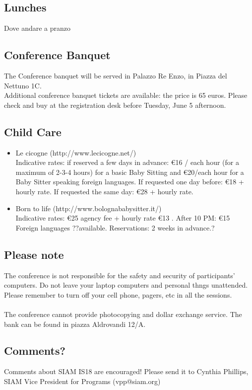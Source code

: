 \begin{multicols}{2}
\subsection*{Lunches}
Dove andare a pranzo
\subsection*{Conference Banquet}
The Conference banquet will be served in Palazzo Re Enzo, in Piazza del Nettuno 1C.\\ Additional conference banquet tickets are available: the price is 65 euros. Please check and buy at the registration desk before Tuesday, June 5 afternoon.
\subsection*{Child Care}
\begin{itemize}
\item Le cicogne (http://www.lecicogne.net/)\\
Indicative rates: if reserved a few days in advance: \euro 16 / each hour (for a maximum of 2-3-4 hours) for a basic Baby Sitting and \euro 20/each hour for a Baby Sitter speaking foreign languages.
If requested one day before: \euro 18 + hourly rate.
If requested the same day: \euro 28 + hourly rate.
\item Born to life (http://www.bolognababysitter.it/)\\
Indicative rates: \euro 25 agency fee + hourly rate \euro 13 . After 10 PM: \euro 15 Foreign languages ??available. Reservations: 2 weeks in advance.?
\end{itemize}
\subsection*{Please note}
The conference is not responsible for the safety and security of participants' computers. Do not leave your laptop computers and personal thngs unattended. Please remember to turn off your cell phone, pagers, etc in all the sessions.\\\\ The conference cannot provide photocopying and dollar exchange service. The bank can be found in piazza Aldrovandi 12/A.
\subsection*{Comments?}
Comments about SIAM IS18 are encouraged! Please send it to Cynthia Phillips, SIAM Vice President for Programs (vpp@siam.org)
\end{multicols}
